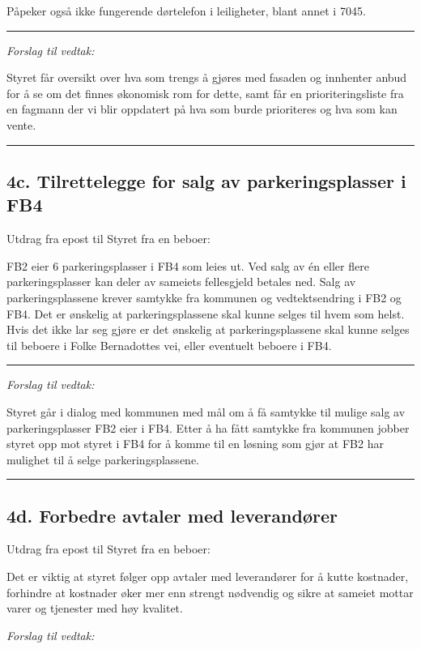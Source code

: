 \documentclass[12pt]{article}
\begin{document}
Påpeker også ikke fungerende dørtelefon i leiligheter, blant annet i 7045.

{\rule{\textwidth}{0.3pt}}

{\em Forslag til vedtak:}

Styret får oversikt over hva som trengs å gjøres med fasaden og innhenter anbud
for å se om det finnes økonomisk rom for dette, samt får en prioriteringsliste fra en fagmann der
vi blir oppdatert på hva som burde prioriteres og hva som kan vente.\\
{\rule{\textwidth}{0.3pt}}

\subsection*{4c. Tilrettelegge for salg av parkeringsplasser i FB4}

Utdrag fra epost til Styret fra en beboer:

FB2 eier 6 parkeringsplasser i FB4 som leies ut. Ved salg av én eller flere parkeringsplasser kan
deler av sameiets fellesgjeld betales ned. Salg av parkeringsplassene krever samtykke fra kommunen
og vedtektsendring i FB2 og FB4. Det er ønskelig at parkeringsplassene skal kunne selges til hvem
som helst. Hvis det ikke lar seg gjøre er det ønskelig at parkeringsplassene skal kunne selges til
beboere i Folke Bernadottes vei, eller eventuelt beboere i FB4.

{\rule{\textwidth}{0.3pt}}

{\em Forslag til vedtak:}

Styret går i dialog med kommunen med mål om å få samtykke til mulige salg av parkeringsplasser FB2
eier i FB4. Etter å ha fått samtykke fra kommunen jobber styret opp mot styret i FB4 for å komme
til en løsning som gjør at FB2 har mulighet til å selge
parkeringsplassene.\\
{\rule{\textwidth}{0.3pt}}

\subsection*{4d. Forbedre avtaler med leverandører}

Utdrag fra epost til Styret fra en beboer:

Det er viktig at styret følger opp avtaler med leverandører for å kutte kostnader, forhindre at
kostnader øker mer enn strengt nødvendig og sikre at sameiet mottar varer og tjenester med høy
kvalitet.

{\em Forslag til vedtak:}
\end{document}
